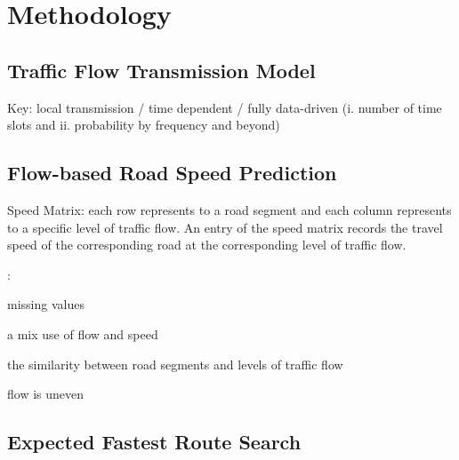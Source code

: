 \section{Methodology}
\label{sec-method}


\subsection{Traffic Flow Transmission Model}
\label{subsec-transmission}

Key: local transmission / time dependent / fully data-driven (i. number of time slots and ii. probability by frequency and beyond)




\subsection{Flow-based Road Speed Prediction}
\label{subsec-speed}

Speed Matrix: each row represents to a road segment and each column represents to a specific level of traffic flow. An entry of the speed matrix records the travel speed of the corresponding road at the corresponding level of traffic flow.


:
\bi
\item missing values
\item a mix use of flow and speed
\item the similarity between road segments and levels of traffic flow
\item flow is uneven
\ei

\subsection{Expected Fastest Route Search}
\label{subsec-route} 